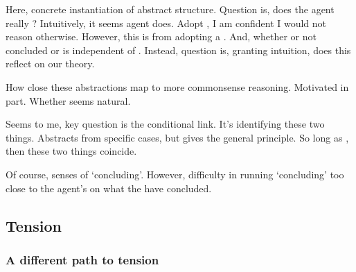 \begin{note}[Difficulty]
  Here, concrete instantiation of abstract structure.
  Question is, does the agent really \csN{}?
  Intuitively, it seems agent does.
  Adopt \stance{}, I am confident I would not reason otherwise.
  However, this is from adopting a \stance{}.
  And, whether or not concluded or \csVed{} is independent of \stance{}.
  Instead, question is, granting intuition, does this \stance{} reflect on our theory.

  How close these abstractions map to more commonsense reasoning.
  Motivated in part.
  Whether \csN{} seems natural.

  Seems to me, key question is the conditional link.
  It's identifying these two things.
  Abstracts from specific cases, but gives the general principle.
  So long as \csN{}, then these two things coincide.

  Of course, senses of `concluding'.
  However, difficulty in running `concluding' too close to the agent's \stance{} on what the have concluded.
\end{note}

\subsection{Tension}
\label{sec:overview:tension:subsection}


\subsubsection{A different path to tension}
\label{sec:diff-path-tens}

